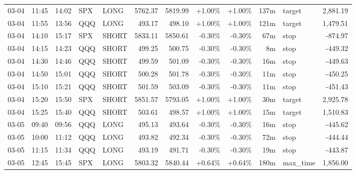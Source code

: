 \documentclass[11pt,a4paper,twoside]{article}
\begin{document}
\begin{center}
\begin{longtable}{>{\color{txtmain}}l l l l l r r r r r >{\color{txtmain}}l r}
03-04 & 11:45 & 14:02 & SPX & LONG & 5762.37 & 5819.99 & \textcolor{wingreen}{+1.00\%} & \textcolor{wingreen}{+1.00\%} & 137m & target & \textcolor{wingreen}{2,881.19} \\
03-04 & 11:55 & 13:56 & QQQ & LONG & 493.17 & 498.10 & \textcolor{wingreen}{+1.00\%} & \textcolor{wingreen}{+1.00\%} & 121m & target & \textcolor{wingreen}{1,479.51} \\
03-04 & 14:10 & 15:17 & SPX & SHORT & 5833.11 & 5850.61 & \textcolor{lossred}{-0.30\%} & \textcolor{lossred}{-0.30\%} & 67m & stop & \textcolor{lossred}{-874.97} \\
03-04 & 14:15 & 14:23 & QQQ & SHORT & 499.25 & 500.75 & \textcolor{lossred}{-0.30\%} & \textcolor{lossred}{-0.30\%} & 8m & stop & \textcolor{lossred}{-449.32} \\
03-04 & 14:30 & 14:46 & QQQ & SHORT & 499.59 & 501.09 & \textcolor{lossred}{-0.30\%} & \textcolor{lossred}{-0.30\%} & 16m & stop & \textcolor{lossred}{-449.63} \\
03-04 & 14:50 & 15:01 & QQQ & SHORT & 500.28 & 501.78 & \textcolor{lossred}{-0.30\%} & \textcolor{lossred}{-0.30\%} & 11m & stop & \textcolor{lossred}{-450.25} \\
03-04 & 15:10 & 15:21 & QQQ & SHORT & 501.59 & 503.09 & \textcolor{lossred}{-0.30\%} & \textcolor{lossred}{-0.30\%} & 11m & stop & \textcolor{lossred}{-451.43} \\
03-04 & 15:20 & 15:50 & SPX & SHORT & 5851.57 & 5793.05 & \textcolor{wingreen}{+1.00\%} & \textcolor{wingreen}{+1.00\%} & 30m & target & \textcolor{wingreen}{2,925.78} \\
03-04 & 15:25 & 15:40 & QQQ & SHORT & 503.61 & 498.57 & \textcolor{wingreen}{+1.00\%} & \textcolor{wingreen}{+1.00\%} & 15m & target & \textcolor{wingreen}{1,510.83} \\
03-05 & 09:40 & 09:56 & QQQ & LONG & 495.13 & 493.64 & \textcolor{lossred}{-0.30\%} & \textcolor{lossred}{-0.30\%} & 16m & stop & \textcolor{lossred}{-445.62} \\
03-05 & 10:00 & 11:12 & QQQ & LONG & 493.82 & 492.34 & \textcolor{lossred}{-0.30\%} & \textcolor{lossred}{-0.30\%} & 72m & stop & \textcolor{lossred}{-444.44} \\
03-05 & 11:15 & 11:34 & QQQ & LONG & 493.19 & 491.71 & \textcolor{lossred}{-0.30\%} & \textcolor{lossred}{-0.30\%} & 19m & stop & \textcolor{lossred}{-443.87} \\
03-05 & 12:45 & 15:45 & SPX & LONG & 5803.32 & 5840.44 & \textcolor{wingreen}{+0.64\%} & \textcolor{wingreen}{+0.64\%} & 180m & max\_time & \textcolor{wingreen}{1,856.00} \\

\end{longtable}
\end{center}
\end{document}
